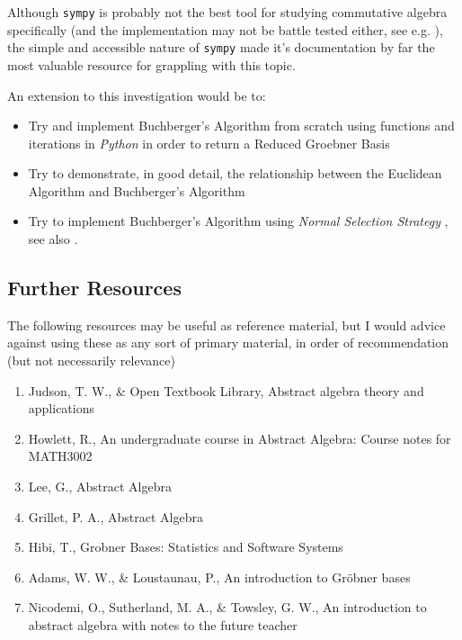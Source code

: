 \documentclass[a4paper,11pt,twoside]{article}
\begin{document}
Although \texttt{sympy} is probably not the best tool for studying
commutative algebra specifically (and the implementation may not be
battle tested either, see e.g. \cite{WrongGroebnerBasis}), the simple
and accessible nature of \texttt{sympy} made it's documentation by far the
most valuable resource for grappling with this topic.

An extension to this investigation would be to:

\begin{itemize}
\item Try and implement Buchberger's Algorithm from scratch using
functions and iterations in \emph{Python} in order to return a Reduced
Groebner Basis
\item Try to demonstrate, in good detail, the relationship between
the Euclidean Algorithm and Buchberger's Algorithm
\item Try to implement Buchberger's Algorithm using \emph{Normal Selection
Strategy} \cite[\S 3.1.2]{hibiGrobnerBasesStatistics2014}, see also \cite{sympydevelopmentteamSympyPolysGroebnertools,prof.berndsturmfelsIntroductionGrobnerBases2017}.
\end{itemize}

\subsection{Further Resources}
\label{sec:org3da794c}
The following resources may be useful as reference material, but I
would advice against using these as any sort of primary material,
in order of recommendation (but not necessarily relevance)



\begin{enumerate}
\item Judson, T. W., \& Open Textbook Library, Abstract algebra
theory and applications \cite{judsonAbstractAlgebraTheory2016}
\item Howlett, R., An undergraduate course in Abstract Algebra:
Course notes for MATH3002 \cite{roberthowlettUndergraduateCourseAbstract}
\item Lee, G., Abstract Algebra \cite{gregoryleeAbstractAlgebra2018}
\item Grillet, P. A., Abstract Algebra \cite{grilletAbstractAlgebra2007}
\item Hibi, T., Grobner Bases: Statistics and Software Systems \cite{hibiGrobnerBasesStatistics2014}
\item Adams, W. W., \& Loustaunau, P., An introduction to Gröbner bases \cite{adamsIntroductionGrobnerBases1994}
\item Nicodemi, O., Sutherland, M. A., \& Towsley, G. W., An
introduction to abstract algebra with notes to the future
teacher \cite{nicodemiIntroductionAbstractAlgebra2007a}
\end{enumerate}
\end{document}
